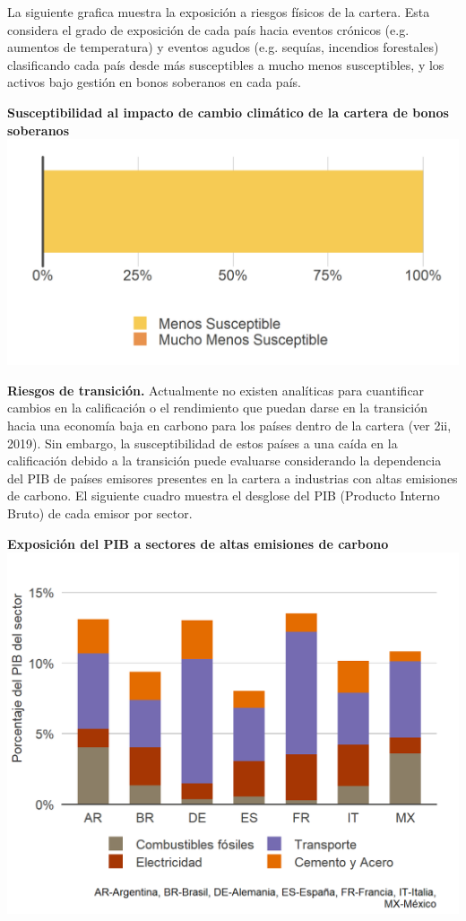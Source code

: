 \documentclass[10pt,table]{article}\usepackage[]{graphicx}\usepackage[]{color}
\begin{document}
\begin{multicols}{2}
	La siguiente grafica muestra la exposición a riesgos físicos de la cartera. Esta considera el grado de exposición de cada país hacia eventos crónicos (e.g. aumentos de temperatura) y eventos agudos (e.g. sequías, incendios forestales) clasificando cada país desde más susceptibles a mucho menos susceptibles, y los activos bajo gestión en bonos soberanos en cada país.
	 
		
		
		\textbf{Susceptibilidad al impacto de cambio climático de la cartera de bonos soberanos}\\
		\includegraphics[trim = {0, 0, 0, 0cm},width=1\linewidth]{ReportOutputs/Fig92}
		
		\textbf{Riesgos de transición.} Actualmente no existen analíticas para cuantificar cambios en la calificación o el rendimiento que puedan darse en la transición hacia una economía baja en carbono para los países dentro de la cartera (ver 2ii, 2019). Sin embargo, la susceptibilidad de estos países a una caída en la calificación debido a la transición puede evaluarse considerando la dependencia del PIB de países emisores presentes en la cartera a industrias con altas emisiones de carbono. El siguiente cuadro muestra el desglose del PIB (Producto Interno Bruto) de cada emisor por sector.
		
		\textbf{Exposición del PIB a sectores de altas emisiones de carbono} \\
		\includegraphics[trim = {0, 0, 0, 0cm},width=1\linewidth]{ReportOutputs/Fig93}
		

\end{multicols}
\end{document}
